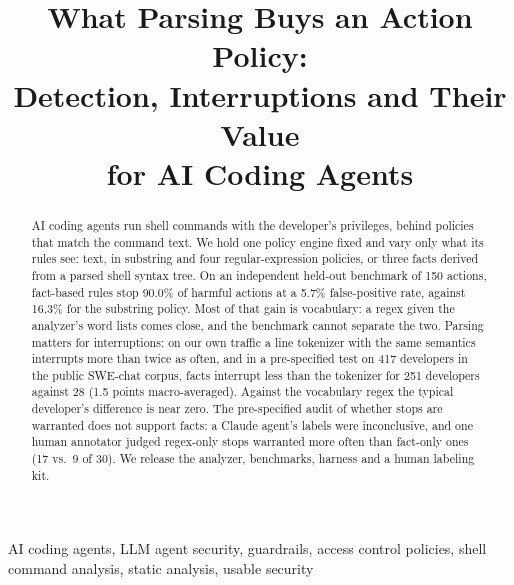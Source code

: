\documentclass[conference]{IEEEtran}
\begin{document}
\title{What Parsing Buys an Action Policy:\\Detection, Interruptions and Their Value\\for AI Coding Agents\vspace{-0.3\baselineskip}}

\author{
\vspace{-0.8\baselineskip}}
\IEEEaftertitletext{\vspace{-1.6\baselineskip}}

\maketitle

\begin{abstract}
AI coding agents run shell commands with the developer's privileges, behind policies that match the command text. We hold one policy engine fixed and vary only what its rules see: text, in substring and four regular-expression policies, or three facts derived from a parsed shell syntax tree. On an independent held-out benchmark of 150 actions, fact-based rules stop 90.0\% of harmful actions at a 5.7\% false-positive rate, against 16.3\% for the substring policy. Most of that gain is vocabulary: a regex given the analyzer's word lists comes close, and the benchmark cannot separate the two. Parsing matters for interruptions: on our own traffic a line tokenizer with the same semantics interrupts more than twice as often, and in a pre-specified test on 417 developers in the public SWE-chat corpus, facts interrupt less than the tokenizer for 251 developers against 28 (1.5 points macro-averaged). Against the vocabulary regex the typical developer's difference is near zero. The pre-specified audit of whether stops are warranted does not support facts: a Claude agent's labels were inconclusive, and one human annotator judged regex-only stops warranted more often than fact-only ones (17 vs.\ 9 of 30). We release the analyzer, benchmarks, harness and a human labeling kit.
\end{abstract}

\begin{IEEEkeywords}
AI coding agents, LLM agent security, guardrails, access control policies, shell command analysis, static analysis, usable security
\end{IEEEkeywords}
\end{document}
